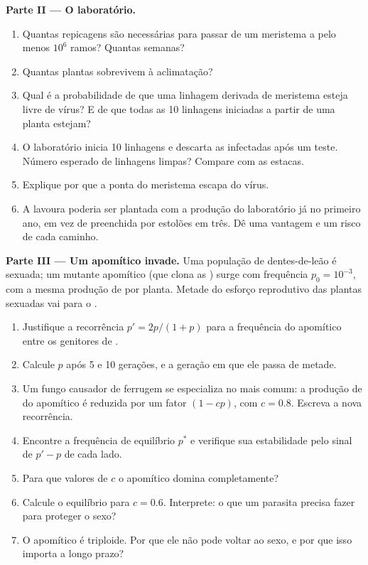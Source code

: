 \begin{problem}
\medskip
\noindent\textbf{Parte II --- O laboratório.}
\begin{enumerate}[resume]
  \item Quantas repicagens são necessárias para passar de um meristema a
        pelo menos $10^{6}$ ramos? Quantas semanas?
  \item Quantas plantas sobrevivem à aclimatação?
  \item Qual é a probabilidade de que uma linhagem derivada de meristema
        esteja livre de vírus? E de que todas as \num{10} linhagens
        iniciadas a partir de uma planta estejam?
  \item O laboratório inicia \num{10} linhagens e descarta as
        infectadas após um teste. Número esperado de linhagens limpas?
        Compare com as estacas.
  \item Explique por que a ponta do meristema escapa do vírus.
  \item A lavoura poderia ser plantada com a produção do laboratório já
        no primeiro ano, em vez de preenchida por estolões em três.
        Dê uma vantagem e um risco de cada caminho.
\end{enumerate}

\medskip
\noindent\textbf{Parte III --- Um apomítico invade.}
Uma população de dentes-de-leão é sexuada; um mutante apomítico (que
clona as ) surge com frequência $p_0 = 10^{-3}$, com a mesma
produção de  por planta. Metade do esforço reprodutivo das
plantas sexuadas vai para o .
\begin{enumerate}[resume]
  \item Justifique a recorrência $p' = 2p/(1 + p)$ para a frequência do
        apomítico entre os genitores de .
  \item Calcule $p$ após 5 e 10 gerações, e a geração em que ele passa
        de metade.
  \item Um fungo causador de ferrugem se especializa no  mais
        comum: a produção de  do apomítico é reduzida por um
        fator $(1 - cp)$, com $c = 0.8$. Escreva a nova recorrência.
  \item Encontre a frequência de equilíbrio $p^*$ e verifique sua
        estabilidade pelo sinal de $p' - p$ de cada lado.
  \item Para que valores de $c$ o apomítico domina completamente?
  \item Calcule o equilíbrio para $c = 0.6$. Interprete: o que um
        parasita precisa fazer para proteger o sexo?
  \item O apomítico é triploide. Por que ele não pode voltar ao sexo, e
        por que isso importa a longo prazo?
\end{enumerate}


\end{problem}
